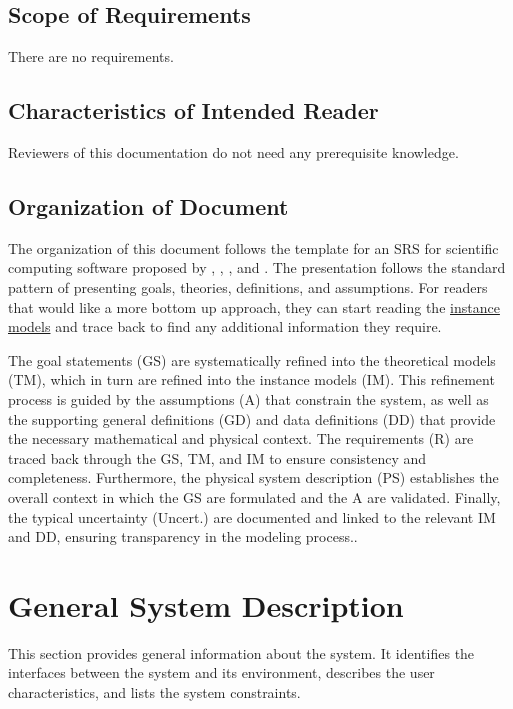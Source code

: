 \documentclass[12pt]{article}
\begin{document}
\subsection{Scope of Requirements}
\label{Sec:ReqsScope}
There are no requirements.

\subsection{Characteristics of Intended Reader}
\label{Sec:ReaderChars}
Reviewers of this documentation do not need any prerequisite knowledge.

\subsection{Organization of Document}
\label{Sec:DocOrg}
The organization of this document follows the template for an SRS for scientific computing software proposed by \cite{koothoor2013}, \cite{smithLai2005}, \cite{smithEtAl2007}, and \cite{smithKoothoor2016}. The presentation follows the standard pattern of presenting goals, theories, definitions, and assumptions. For readers that would like a more bottom up approach, they can start reading the \hyperref[Sec:IMs]{instance models} and trace back to find any additional information they require.

The goal statements (GS) are systematically refined into the theoretical models (TM), which in turn are refined into the instance models (IM). This refinement process is guided by the assumptions (A) that constrain the system, as well as the supporting general definitions (GD) and data definitions (DD) that provide the necessary mathematical and physical context. The requirements (R) are traced back through the GS, TM, and IM to ensure consistency and completeness. Furthermore, the physical system description (PS) establishes the overall context in which the GS are formulated and the A are validated. Finally, the typical uncertainty (Uncert.) are documented and linked to the relevant IM and DD, ensuring transparency in the modeling process..

\section{General System Description}
\label{Sec:GenSysDesc}
This section provides general information about the system. It identifies the interfaces between the system and its environment, describes the user characteristics, and lists the system constraints.
\end{document}
